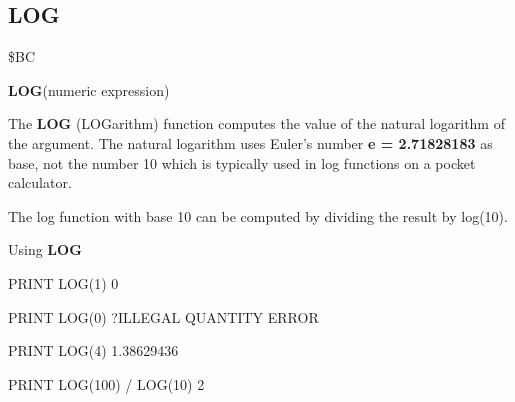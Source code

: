 
\newpage
\subsection{LOG}
\begin{description}[leftmargin=3cm,style=nextline]
\item [Token:] \$BC
\item [Format:] {\bf LOG}(numeric expression)
\item [Usage:] The {\bf LOG} (LOGarithm) function computes
               the value of the natural logarithm of the argument.
               The natural logarithm uses
               Euler's number {\bf e = 2.71828183} as base,
               not the number 10 which is typically used
               in log functions on a pocket calculator.

\item [Remarks:] The log function with base 10 can be computed
                 by dividing the result by log(10).
\item [Example:] Using {\bf LOG}
\begin{screenoutput}
PRINT LOG(1)
 0

PRINT LOG(0)
 ?ILLEGAL QUANTITY ERROR

PRINT LOG(4)
 1.38629436

PRINT LOG(100) / LOG(10)
 2
\end{screenoutput}
\end{description}


\newpage

